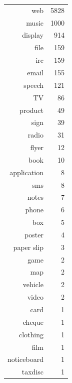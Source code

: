 \documentclass[xcolor=x11names,compress,handout]{beamer}
\begin{document}
{\begin{columns}
        \begin{table}[ht]
            \centering
            \begin{tabular}{rr}
                web & 5828 \\ 
                music & 1000 \\ 
                display & 914 \\ 
                file & 159 \\ 
                irc & 159 \\ 
                email & 155 \\ 
                speech & 121 \\ 
                TV &  86 \\ 
                product &  49 \\ 
                sign &  39 \\ 
                radio &  31 \\ 
                flyer &  12 \\ 
                book &  10 \\ 
                application &   8 \\ 
                sms &   8 \\ 
                notes &   7 \\ 
                phone &   6 \\ 
                box &   5 \\ 
                poster &   4 \\ 
                paper slip &   3 \\ 
                game &   2 \\ 
                map &   2 \\ 
                vehicle &   2 \\ 
                video &   2 \\ 
                card &   1 \\ 
                cheque &   1 \\ 
                clothing &   1 \\ 
                film &   1 \\ 
                noticeboard &   1 \\ 
                taxdisc &   1
            \end{tabular}
        \end{table}


    \end{columns}

    \note{}
}
\end{document}
